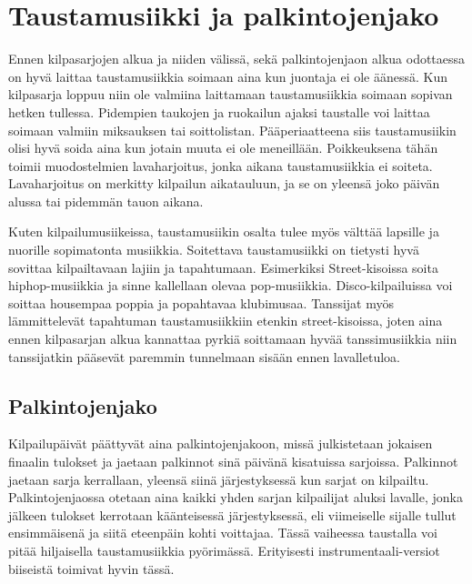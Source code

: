 \documentclass[12pt, a4paper, oneside]{article}
\begin{document}
\section{Taustamusiikki ja palkintojenjako} \label{tausta_musa}

Ennen kilpasarjojen alkua ja niiden välissä, sekä palkintojenjaon alkua odottaessa on hyvä laittaa taustamusiikkia soimaan aina kun juontaja ei ole äänessä. Kun kilpasarja loppuu niin ole valmiina laittamaan taustamusiikkia soimaan sopivan hetken tullessa. Pidempien taukojen ja ruokailun ajaksi taustalle voi laittaa soimaan valmiin miksauksen tai soittolistan. Pääperiaatteena siis taustamusiikin olisi hyvä soida aina kun jotain muuta ei ole meneillään. Poikkeuksena tähän toimii muodostelmien lavaharjoitus, jonka aikana taustamusiikkia ei soiteta. Lavaharjoitus on merkitty kilpailun aikatauluun, ja se on yleensä joko päivän alussa tai pidemmän tauon aikana.

Kuten kilpailumusiikeissa, taustamusiikin osalta tulee myös välttää lapsille ja nuorille sopimatonta musiikkia. Soitettava taustamusiikki on tietysti hyvä sovittaa kilpailtavaan lajiin ja tapahtumaan. Esimerkiksi Street-kisoissa soita hiphop-musiikkia ja sinne kallellaan olevaa pop-musiikkia. Disco-kilpailuissa voi soittaa housempaa poppia ja popahtavaa klubimusaa. Tanssijat myös lämmittelevät tapahtuman taustamusiikkiin etenkin street-kisoissa, joten aina ennen kilpasarjan alkua kannattaa pyrkiä soittamaan hyvää tanssimusiikkia niin tanssijatkin pääsevät paremmin tunnelmaan sisään ennen lavalletuloa.

\subsection{Palkintojenjako}

Kilpailupäivät päättyvät aina palkintojenjakoon, missä julkistetaan jokaisen finaalin tulokset ja jaetaan palkinnot sinä päivänä kisatuissa sarjoissa. Palkinnot jaetaan sarja kerrallaan, yleensä siinä järjestyksessä kun sarjat on kilpailtu. Palkintojenjaossa otetaan aina kaikki yhden sarjan kilpailijat aluksi lavalle, jonka jälkeen tulokset kerrotaan käänteisessä järjestyksessä, eli viimeiselle sijalle tullut ensimmäisenä ja siitä eteenpäin kohti voittajaa. Tässä vaiheessa taustalla voi pitää hiljaisella taustamusiikkia pyörimässä. Erityisesti instrumentaali-versiot biiseistä toimivat hyvin tässä.
\end{document}
